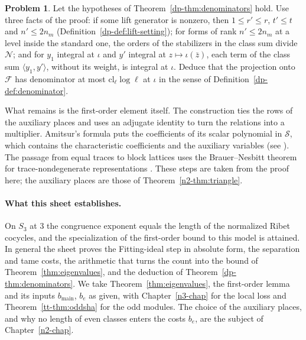 \documentclass[reqno]{amsart}
\newcounter{chap}
\theoremstyle{definition}
\newtheorem{problem}{Problem}[section]
\theoremstyle{plain}
\newcommand{\cl}{\mathrm{cl}}
\begin{document}
\begin{problem}\label{pr:deduce}
Let the hypotheses of Theorem~\ref{dp-thm:denominators} hold.  Use three facts of the proof: if some lift generator is nonzero, then \(1 \le r' \le r\), \(t' \le t\) and \(n' \le 2n_m\) (Definition~\ref{dp-def:lift-setting}); for forms of rank \(n' \le 2n_m\) at a level inside the standard one, the orders of the stabilizers in the class sum divide \(\mathcal N\); and for \(y_1\) integral at \(\iota\) and \(y'\) integral at \(z \mapsto \iota(\bar z)\), each term of the class sum \(\langle y_1, y' \rangle\), without its weight, is integral at \(\iota\).  Deduce that the projection onto \(\mathcal F\) has denominator at most \(\cl_\ell\log\ell\) at \(\iota\) in the sense of Definition~\ref{dp-def:denominator}.
\end{problem}

What remains is the first-order element itself.  The construction ties the rows of the auxiliary places and uses an adjugate identity to turn the relations into a multiplier.  Amitsur's formula puts the coefficients of its scalar polynomial in \(\mathcal S\), which contains the characteristic coefficients and the auxiliary variables \cite{Am} (see \cite[formula (1.5)]{Ch}).  The passage from equal traces to block lattices uses the Brauer--Nesbitt theorem for trace-nondegenerate representations \cite[(30.16)]{CR}.  These steps are taken from the proof here; the auxiliary places are those of Theorem~\ref{n2-thm:triangle}.

\paragraph{What this sheet establishes.}  On \(S_3\) at \(3\) the congruence exponent equals the length of the normalized Ribet cocycles, and the specialization of the first-order bound to this model is attained.  In general the sheet proves the Fitting-ideal step in absolute form, the separation and tame costs, the arithmetic that turns the count into the bound of Theorem~\ref{thm:eigenvalues}, and the deduction of Theorem~\ref{dp-thm:denominators}.  We take Theorem~\ref{thm:eigenvalues}, the first-order lemma and its inputs \(b_{\mathrm{main}}\), \(b_e\) as given, with Chapter~\ref{n3-chap} for the local loss and Theorem~\ref{tt-thm:oddsha} for the odd modules.  The choice of the auxiliary places, and why no length of even classes enters the costs \(b_e\), are the subject of Chapter~\ref{n2-chap}.
\end{document}
